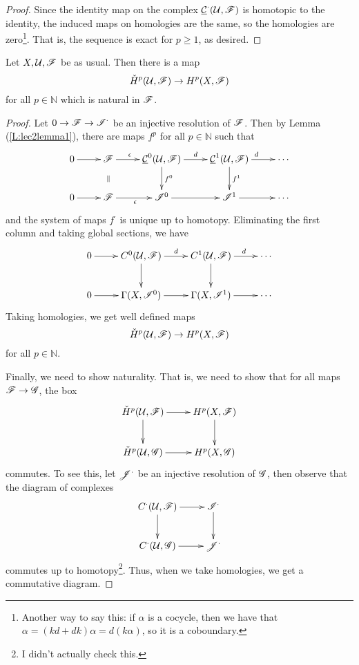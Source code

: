 \begin{proof}
Since the identity map on the complex $\underline{\mathcal{C}}^{\cdot}(\mathcal{U},\mathscr{F})$ is
homotopic to the identity, the induced maps on homologies are the
same, so the homologies are zero\footnote{Another way to say this:
if $\alpha$ is a cocycle, then we have that $\alpha =
(kd+dk)\alpha = d(k\alpha)$, so it is a coboundary.}. That is, the
sequence is exact for $p\ge 1$, as desired.
\end{proof}

\begin{lemma}\label{L:lec11cohommap}
Let $X,\mathcal{U},\mathscr{F}$ be as usual.  Then there is a map
\[
    \check H^p(\mathcal{U},\mathscr{F}) \to H^p(X,\mathscr{F})
\]
for all $p\in \mathbb{N}$ which is natural in $\mathscr{F}$.
\end{lemma}
\begin{proof}
Let $0\to \mathscr{F} \to \mathscr{I}^{\cdot}$ be an injective resolution of $\mathscr{F}$.
Then by Lemma (\ref{L:lec2lemma1}), there are maps $f^p$ for all
$p\in \mathbb{N}$ such that
\[\xymatrix{
 0 \ar[r] & \F \ar[r]^(.4){\epsilon}\ar@{}[d]|{\parallel} &
 \C^0(\U,\F)\ar[r]^d \ar[d]^{f^0} & \C^1(\U,\F)
 \ar[r]^d\ar[d]^{f^1} & \cdots\\
 0 \ar[r] & \F \ar[r]_{\epsilon} & \I^0\ar[r] & \I^1\ar[r] & \cdots
}\] and the system of maps $f^{\cdot}$ is unique up to homotopy.
Eliminating the first column and taking global sections, we have
\[\xymatrix{
 0\ar[r] & C^0(\U,\F) \ar[r]^d \ar[d] & C^1(\U,\F)\ar[r]^(.6)d \ar[d] & \cdots \\
 0\ar[r] & \Gamma(X,\I^0)\ar[r] & \Gamma(X,\I^1)\ar[r] & \cdots
}\] Taking homologies, we get well defined maps
\[
    \check H^p(\mathcal{U},\mathscr{F})\to H^p(X,\mathscr{F})
\]
for all $p\in \mathbb{N}$.

Finally, we need to show naturality.  That is, we need to show
that for all maps $\mathscr{F}\to \mathscr{G}$, the box
\[\xymatrix{
 \check H^p(\U,\F) \ar[r]\ar[d] & H^p(X,\F)\ar[d]\\
 \check H^p(\U,\G) \ar[r] & H^p(X,\G)
}\] commutes.  To see this, let $\mathscr{J}^{\cdot}$ be an injective
resolution of $\mathscr{G}$, then observe that the diagram of complexes
\[\xymatrix{
 C^{\cdot}(\U,\F) \ar[r]\ar[d] & \I^{\cdot}\ar[d]\\
 C^{\cdot}(\U,\G) \ar[r] & \J^{\cdot}
}\] commutes up to homotopy\footnote{I didn't actually check
this.}. Thus, when we take homologies, we get a commutative
diagram.
\end{proof}

